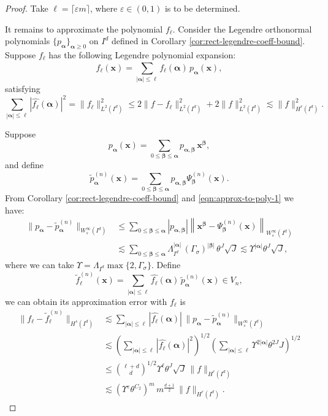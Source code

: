 \documentclass{article}
\numberwithin{equation}{section}
\def\lt{\left}
\def\rt{\right}
\def\balpha{{\bm\alpha}}
\def\bbeta{{\bm\beta}}
\def\bx{{\bm x}}
\begin{document}
\begin{proof}
    Take $\ell=\lceil\varepsilon m\rceil$, where $\varepsilon\in(0,1)$ is to be determined. 

    It remains to approximate the polynomial $f_\ell$. Consider the Legendre orthonormal polynomials $\{p_\balpha\}_{\balpha\geq 0}$ on $I^d$ defined in Corollary \ref{cor:rect-legendre-coeff-bound}.
    Suppose $f_\ell$ has the following Legendre polynomial expansion:
    $$ f_\ell(\bx) = \sum_{|\balpha|\leq \ell} \widehat{f_\ell}(\balpha)\, p_\balpha(\bx), $$
    satisfying 
    $$ \sum_{|\balpha|\leq \ell} |\widehat{f_\ell}(\balpha)|^2 = \|f_\ell\|_{L^2(I^d)}^2\leq 2\|f-f_\ell\|_{L^2(I^d)}^2 + 2\|f\|_{L^2(I^d)}^2 \lesssim \|f\|_{H^r(I^d)}^2.$$

    Suppose $$p_\balpha(\bx) = \sum_{0\leq\bbeta\leq\balpha} p_{\balpha,\bbeta} \,\bx^\bbeta,$$ and define
    $$ \widetilde{p}_\balpha^{(n)}(\bx) = \sum_{0\leq \bbeta \leq \balpha} p_{\balpha,\bbeta} \Psi_\bbeta^{(n)}(\bx).$$
    From Corollary \ref{cor:rect-legendre-coeff-bound} and \eqref{eqn:approx-to-poly-1} we have:
    \begin{equation}
    \begin{split}
        \|p_\balpha - \widetilde{p}_\balpha^{(n)}\|_{W^\infty_s(I^d)} 
        &\leq \sum_{0\leq \bbeta \leq \balpha} |p_{\balpha,\bbeta}| \lt\|\bx^\bbeta - \Psi_\bbeta^{(n)}(\bx)\rt\|_{W^\infty_s(I^d)} \\
        &\lesssim \sum_{0\leq \bbeta \leq \balpha} \Lambda_{I^d}^{|\balpha|}\, (\Gamma_\sigma)^{|\bbeta|}\,\theta^J \sqrt J 
        \lesssim \Upsilon^{|\balpha|} \theta^J\sqrt J,
    \end{split}
    \end{equation}
    where we can take $\Upsilon=\Lambda_{I^d}\max\{2,\Gamma_\sigma\}$. Define 
    $$\widetilde{f}_\ell^{(n)}(\bx) = \sum_{|\balpha|\leq \ell} \widehat{f_\ell}(\balpha) \,\widetilde p_\balpha^{(n)}(\bx)\in V_n,$$
    we can obtain its approximation error with $f_\ell$ is
    \begin{equation}
    \begin{split}
         \|f_\ell-\widetilde{f}_\ell^{(n)}\|_{H^s(I^d)} 
         &\lesssim \sum_{|\balpha|\leq \ell} |\widehat{f_\ell}(\balpha)|\,\|p_\balpha - \widetilde{p}_\balpha^{(n)}\|_{W^\infty_s(I^d)} \\
         &\lesssim \lt(\sum_{|\balpha|\leq \ell} |\widehat{f_\ell}(\balpha)|^2 \rt)^{1/2} \lt(\sum_{|\balpha|\leq \ell} \Upsilon^{2|\balpha|}\theta^{2J} J \rt)^{1/2} \\
         &\leq \binom{\ell+d}{d}^{1/2} \Upsilon^\ell \theta^J \sqrt J\, \|f\|_{H^r(I^d)} \\
         &\lesssim (\Upsilon^\varepsilon\theta^{C_2})^m \, m^{\frac{d+1}{2}}\, \|f\|_{H^r(I^d)}.
    \end{split}
    \end{equation}


\end{proof}
\end{document}
